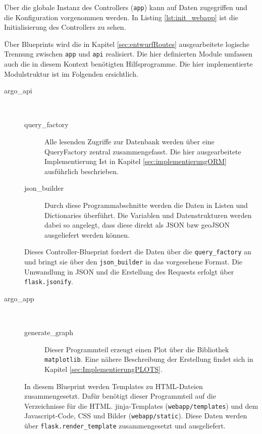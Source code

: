 

Über die globale Instanz des Controllers (\texttt{app}) kann auf Daten zugegriffen und die Konfiguration vorgenommen werden. In Listing \ref{lst:init_webapp} ist die Initialisierung des Controllers zu sehen.

Über Blueprints wird die in Kapitel \ref{sec:entwurfRoutes} ausgearbeitete logische Trennung zwischen \texttt{app} und \texttt{api} realisiert. Die hier definierten Module umfassen auch die in diesem Kontext benötigten Hilfsprogramme. Die hier implementierte Modulstruktur ist im Folgenden ersichtlich.

\begin{description}
 \item [argo\_api] $ $
     
    \begin{description}
     \item [query\_factory] 
        Alle lesenden Zugriffe zur Datenbank werden über eine QueryFactory zentral zusammengefasst. Die hier ausgearbeitete Implementierung Ist in Kapitel \ref{sec:implementierungORM} ausführlich beschrieben.
         
     \item [json\_builder] 
        Durch diese Programmabschnitte werden die Daten in Listen und Dictionaries überführt. Die Variablen und Datenstrukturen werden dabei so angelegt, dass diese direkt als JSON bzw geoJSON ausgeliefert werden können. 
    \end{description}
    
    Dieses Controller-Blueprint fordert die Daten über die \texttt{query\_factory} an und bringt sie über den \texttt{json\_builder} in das vorgesehene Format.  Die Umwandlung in JSON und die Erstellung des Requests erfolgt über \texttt{flask.jsonify}.
\pagebreak
 \item [argo\_app] $ $
 
    \begin{description}
     \item [generate\_graph] Dieser Programmteil erzeugt einen Plot über die Bibliothek \texttt{matplotlib}. Eine nähere Beschreibung der Erstellung findet sich in Kapitel \ref{sec:ImplementierungPLOTS}.
    \end{description}
    
    In diesem Blueprint werden Templates zu HTML-Dateien zusammengesetzt. Dafür benötigt dieser Programmteil auf die Verzeichnisse für die HTML. jinja-Templates (\texttt{webapp/templates}) und dem Javascript-Code, CSS und Bilder (\texttt{webapp/static}). Diese Daten werden über \texttt{flask.render\_template} zusammengesetzt und ausgeliefert.
\end{description}

